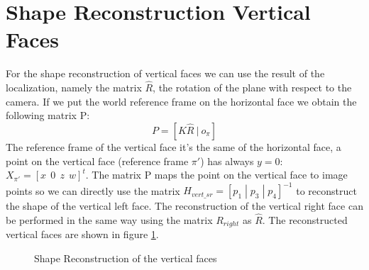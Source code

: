 \documentclass[11pt, oneside]{article}   	%
\begin{document}
\section{Shape Reconstruction Vertical Faces }
For the shape reconstruction of vertical faces we can use the result of the localization, namely the matrix $\hat{R}$, the rotation of the plane with respect to the camera.
If we put the world reference frame on the horizontal face we obtain the following matrix P:
$$ P = [K \hat{R} \  | \ o_\pi ] $$
The reference frame of the vertical face it's the same of the horizontal face, a point on the vertical face (reference frame $\pi'$) has always $y=0$: $X_{\pi'} = [x \ \ 0 \ \ z \ \  w]^t$.
The matrix P maps the point on the vertical face to image points so we can directly use the matrix $ H_{vert\_sr} = [p_1 \; |\; p_3 \;|\; p_4]^{-1}$ to reconstruct the shape of the vertical left face.
The reconstruction of the vertical right face can be performed in the same way using the matrix $R_{right}$ as $\hat{R}$.
The reconstructed  vertical faces are shown in figure \ref{verticalshaperec}.

\begin{figure}
 \centering
    \qquad
    \caption{Shape Reconstruction of the vertical faces}%
    \label{verticalshaperec}%
\end{figure}
\end{document}
